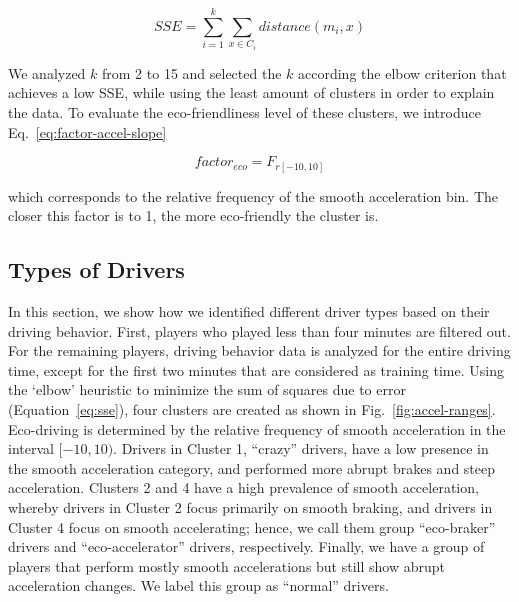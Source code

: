 \documentclass[preprint,authoryear,12pt]{elsarticle}
\begin{document}
\begin{equation}\label{eq:sse}
SSE = \sum\limits_{i=1}^{k} \sum\limits_{x \in C_{i}}distance(m_{i},x)
\end{equation}

We analyzed $k$ from 2 to 15 and selected the $k$ according the elbow criterion \cite{Thorndike.1953} that achieves a low SSE, while using the least amount of clusters in order to explain the data. To evaluate the eco-friendliness level of these clusters, we introduce Eq.~\ref{eq:factor-accel-slope}

\begin{equation}\label{eq:factor-accel-slope}
factor_{eco} = F_{r[-10,10]}
\end{equation}

which corresponds to the relative frequency of the smooth acceleration bin. The closer this factor is to 1, the more eco-friendly the cluster is.


\subsection{Types of Drivers}

In this section, we show how we identified different driver types based on their driving behavior. First, players who played less than four minutes are filtered out. For the remaining players, driving behavior data is analyzed for the entire driving time, except for the first two minutes that are considered as training time.
Using the `elbow' heuristic to minimize the sum of squares due to error (Equation~\ref{eq:sse}), four clusters are created as shown in Fig.~\ref{fig:accel-ranges}.
Eco-driving is determined by the relative frequency of smooth acceleration in the interval $[-10,10)$. Drivers in Cluster 1, ``crazy'' drivers, have a low presence in the smooth acceleration category, and performed more abrupt brakes and steep acceleration.
Clusters 2 and 4 have a high prevalence of smooth acceleration, whereby drivers in Cluster 2 focus primarily on smooth braking, and drivers in Cluster 4 focus on smooth accelerating; hence, we call them group ``eco-braker'' drivers and ``eco-accelerator'' drivers, respectively. Finally, we have a group of players that perform mostly smooth accelerations but still show abrupt acceleration changes. We label this group as ``normal'' drivers.
\end{document}
